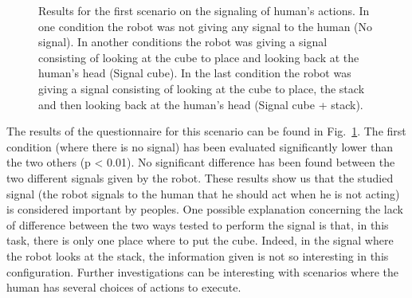 \documentclass[english,a4paper,11pt,twoside]{StyleThese}
\begin{document}
\begin{figure}[!h]
\centering
	\hfill
    \caption{Results for the first scenario on the signaling of human's actions. In one condition the robot was not giving any signal to the human (No signal). In another conditions the robot was giving a signal consisting of looking at the cube to place and looking back at the human's head (Signal cube). In the last condition the robot was giving a signal consisting of looking at the cube to place, the stack and then looking back at the human's head (Signal cube + stack).}
    \label{fig:resSce4}
\end{figure}

The results of the questionnaire for this scenario can be found in Fig.~\ref{fig:resSce4}. The first condition (where there is no signal) has been evaluated significantly lower than the two others (p < 0.01). No significant difference has been found between the two different signals given by the robot. These results show us that the studied signal (the robot signals to the human that he should act when he is not acting) is considered important by peoples. One possible explanation concerning the lack of difference between the two ways tested to perform the signal is that, in this task, there is only one place where to put the cube. Indeed, in the signal where the robot looks at the stack, the information given is not so interesting in this configuration. Further investigations can be interesting with scenarios where the human has several choices of actions to execute.
\end{document}
